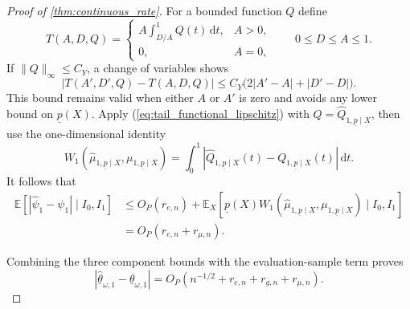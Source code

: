 \begin{proof}[Proof of \cref{thm:continuous_rate}]
\medskip
For a bounded function $Q$ define
\[
    T(A,D,Q)=
    \begin{cases}
      A\displaystyle\int_{D/A}^{1}Q(t)\,\mathrm dt,&A>0,\\
      0,&A=0,
    \end{cases}
    \qquad 0\le D\le A\le1.
\]
If $\|Q\|_\infty\le C_Y$, a change of variables shows
\begin{equation}\label{eq:tail_functional_lipschitz}
    |T(A',D',Q)-T(A,D,Q)|\le C_Y\bigl(2|A'-A|+|D'-D|\bigr).
\end{equation}
This bound remains valid when either $A$ or $A'$ is zero and avoids any lower bound on $\underline{p}(X)$. Apply (\ref{eq:tail_functional_lipschitz}) with $Q=\widehat Q_{1,\underline p\mid X}$, then use the one-dimensional identity
\[
    W_1(\hat\mu_{1,\underline p\mid X},\mu_{1,\underline p\mid X})
    =\int_0^1|\widehat Q_{1,\underline p\mid X}(t)-Q_{1,\underline p\mid X}(t)|\,\mathrm dt.
\]
It follows that
\begin{align*}
    \mathbb E[|\hat\psi_1-\psi_1|\mid I_0,I_1]
    &\le O_P(r_{e,n})
      +\mathbb E_X\!\left[\underline{p}(X)W_1(\hat\mu_{1,\underline p\mid X},\mu_{1,\underline p\mid X})\mid I_0,I_1\right]\\
    &=O_P(r_{e,n}+r_{\mu,n}).
\end{align*}

Combining the three component bounds with the evaluation-sample term proves
\[
    |\hat{\underline\theta}_{\omega,1}-\underline\theta_{\omega,1}|
    =O_P(n^{-1/2}+r_{e,n}+r_{g,n}+r_{\mu,n}).
\]

\end{proof}
